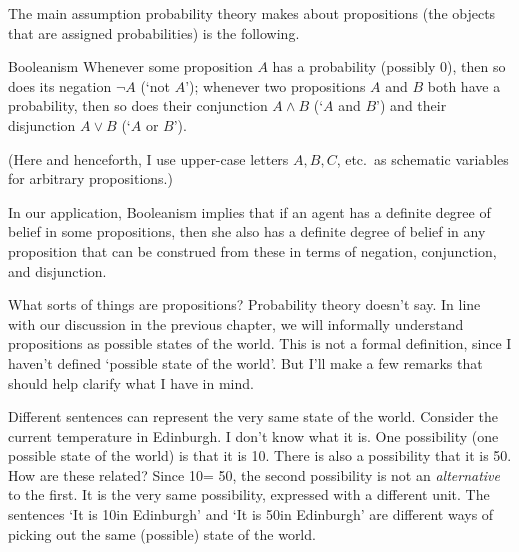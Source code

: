 The main assumption probability theory makes about propositions
(the objects that are assigned probabilities) is the following.
%
\begin{genericthm}{Booleanism}
  \label{p:booleanism}
  Whenever some proposition $A$ has a probability (possibly 0), then so does its
  negation $\neg A$ (`not $A$'); whenever two propositions $A$ and $B$ both have
  a probability, then so does their conjunction $A \land B$ (`$A$ and $B$') and
  their disjunction $A \lor B$ (`$A$ or $B$').
\end{genericthm}
%
\noindent%
(Here and henceforth, I use upper-case letters $A,B,C$, etc.\ as schematic
variables for arbitrary propositions.)

In our application, Booleanism implies that if an agent has a definite degree of
belief in some propositions, then she also has a definite degree of belief in
any proposition that can be construed from these in terms of negation,
conjunction, and disjunction.



What sorts of things are propositions? Probability theory doesn't say. In line
with our discussion in the previous chapter, we will informally understand
propositions as possible states of the world. This is not a formal definition,
since I haven't defined `possible state of the world'. But I'll make a few
remarks that should help clarify what I have in mind.

Different sentences can represent the very same state of the world. Consider the
current temperature in Edinburgh. I don't know what it is. One possibility (one
possible state of the world) is that it is 10\celsius. There is also a
possibility that it is 50\fahrenheit. How are these related? Since 10\celsius =
50\fahrenheit, the second possibility is not an \emph{alternative} to the first.
It is the very same possibility, expressed with a different unit. The sentences
`It is 10\celsius in Edinburgh' and `It is 50\fahrenheit in Edinburgh' are
different ways of picking out the same (possible) state of the world.

